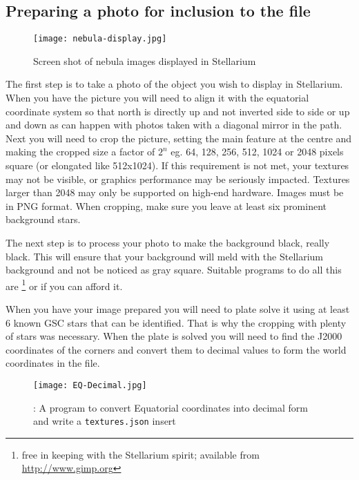 \subsection{Preparing a photo for inclusion to the \texorpdfstring{ file}{textures.json file}}
\label{sec:dso:preparing-a-photo}

\begin{figure}[h]
\centering\texttt{[image: nebula-display.jpg]}
\caption{Screen shot of nebula images displayed in Stellarium}
\label{fig:dso:preparing-a-photo}
\end{figure}

The first step is to take a photo of the object you wish to display in
Stellarium. When you have the picture you will need to align it with
the equatorial coordinate system so that north is directly up and not
inverted side to side or up and down as can happen with photos taken
with a diagonal mirror in the path. Next you will need to crop the
picture, setting the main feature at the centre and making the cropped
size a factor of $2^n$ eg. 64, 128, 256, 512, 1024 or 2048 pixels
square (or elongated like 512x1024).  If this requirement is not met,
your textures may not be visible, or graphics performance may be
seriously impacted. Textures larger than 2048 may only be supported on
high-end hardware. Images must be in PNG format.  When cropping, make
sure you leave at least six prominent background stars.

The next step is to process your photo to make the background
black, really black. This will ensure that your background will meld with the
Stellarium background and not be noticed as gray square. Suitable programs to do all
this are \footnote{free in keeping with the Stellarium spirit; available from \url{http://www.gimp.org}} or
 if you can afford it.

When you have your image prepared you will need to plate solve it using
at least 6 known GSC stars that can be identified. That is why the
cropping with plenty of stars was necessary. When the plate is solved
you will need to find the J2000 coordinates of the corners and convert
them to decimal values to form the world coordinates in the
 file.

\begin{figure}[tb]
\centering\texttt{[image: EQ-Decimal.jpg]}
\caption{: A program to convert Equatorial coordinates into decimal
form and write a \texttt{textures.json} insert}
\label{fig:dso:STGen}
\end{figure}

